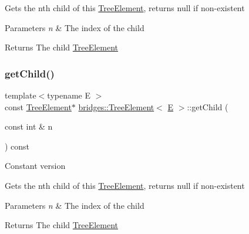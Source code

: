 Gets the nth child of this \mbox{\hyperlink{classbridges_1_1_tree_element}{Tree\+Element}}, returns null if non-\/existent


\begin{DoxyParams}{Parameters}
{\em n} & The index of the child \\
\hline
\end{DoxyParams}
\begin{DoxyReturn}{Returns}
The child \mbox{\hyperlink{classbridges_1_1_tree_element}{Tree\+Element}} 
\end{DoxyReturn}
\mbox{\label{classbridges_1_1_tree_element_a23321ef35ce04dd09487824af804e27b}} 
\subsubsection{\texorpdfstring{getChild()}{getChild()}\hspace{0.1cm}{\footnotesize\ttfamily [2/2]}}
{\footnotesize\ttfamily template$<$typename E $>$ \\
const \mbox{\hyperlink{classbridges_1_1_tree_element}{Tree\+Element}}$\ast$ \mbox{\hyperlink{classbridges_1_1_tree_element}{bridges\+::\+Tree\+Element}}$<$ \mbox{\hyperlink{namespacebridges_acfb0a4f7877d8f63de3e6862004c50eda3a3ea00cfc35332cedf6e5e9a32e94da}{E}} $>$\+::get\+Child (\begin{DoxyParamCaption}\item[{const int \&}]{n }\end{DoxyParamCaption}) const\hspace{0.3cm}{\ttfamily [inline]}}

Constant version

Gets the nth child of this \mbox{\hyperlink{classbridges_1_1_tree_element}{Tree\+Element}}, returns null if non-\/existent


\begin{DoxyParams}{Parameters}
{\em n} & The index of the child \\
\hline
\end{DoxyParams}
\begin{DoxyReturn}{Returns}
The child \mbox{\hyperlink{classbridges_1_1_tree_element}{Tree\+Element}} 
\end{DoxyReturn}
\mbox{\label{classbridges_1_1_tree_element_a52cb83546da21674d306cbb8026f89ac}} 
